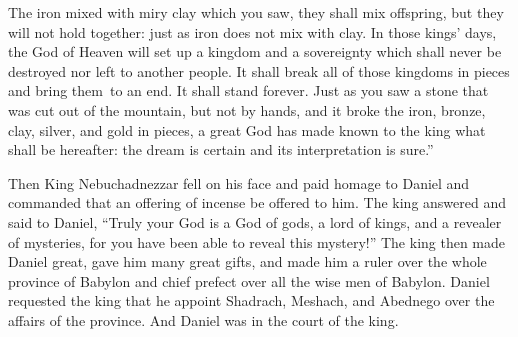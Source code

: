 \begin{inparaenum}
   The iron mixed with miry clay which you saw, they shall mix offspring, but they will not hold together: just as iron does not mix with clay.%
   In those kings' days, the God of Heaven will set up a kingdom and a sovereignty which shall never be destroyed nor left to another people. It shall break all of those kingdoms in pieces and bring them\understood{}\ to an end. It shall stand forever.%
   Just as you saw a stone that was cut out of the mountain, but not by hands, and it broke the iron, bronze, clay, silver, and gold in pieces, a great God has made known to the king what shall be hereafter: the dream is certain and its interpretation is sure.''%

   Then King Nebuchadnezzar fell on his face and paid homage to Daniel and commanded that an offering of incense be offered to him.%
   The king answered and said to Daniel, ``Truly your God is a God of gods, a lord of kings, and a revealer of mysteries, for you have been able to reveal this mystery!''%
   The king then made Daniel great, gave him many great gifts, and made him a ruler over the whole province of Babylon and chief prefect over all the wise men of Babylon.%
   Daniel requested the king that he appoint Shadrach, Meshach, and Abednego over the affairs of the province. And Daniel was in the court of the king.%
\end{inparaenum}
